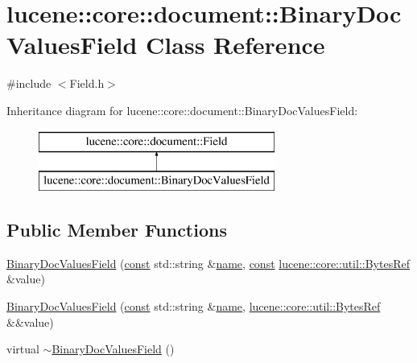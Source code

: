 \hypertarget{classlucene_1_1core_1_1document_1_1BinaryDocValuesField}{}\section{lucene\+:\+:core\+:\+:document\+:\+:Binary\+Doc\+Values\+Field Class Reference}
\label{classlucene_1_1core_1_1document_1_1BinaryDocValuesField}


{\ttfamily \#include $<$Field.\+h$>$}

Inheritance diagram for lucene\+:\+:core\+:\+:document\+:\+:Binary\+Doc\+Values\+Field\+:\begin{figure}[H]
\begin{center}
\leavevmode
\includegraphics[height=2.000000cm]{classlucene_1_1core_1_1document_1_1BinaryDocValuesField}
\end{center}
\end{figure}
\subsection*{Public Member Functions}
\begin{DoxyCompactItemize}
\item 
\mbox{\hyperlink{classlucene_1_1core_1_1document_1_1BinaryDocValuesField_ab25498388b61dec98a2a1bf9b4f73e92}{Binary\+Doc\+Values\+Field}} (\mbox{\hyperlink{ZlibCrc32_8h_a2c212835823e3c54a8ab6d95c652660e}{const}} std\+::string \&\mbox{\hyperlink{classlucene_1_1core_1_1document_1_1Field_a52f673f3b3abb14b180f5159f4726537}{name}}, \mbox{\hyperlink{ZlibCrc32_8h_a2c212835823e3c54a8ab6d95c652660e}{const}} \mbox{\hyperlink{classlucene_1_1core_1_1util_1_1BytesRef}{lucene\+::core\+::util\+::\+Bytes\+Ref}} \&value)
\item 
\mbox{\hyperlink{classlucene_1_1core_1_1document_1_1BinaryDocValuesField_aaa2e860c28eb16a67e2a2c54a6180238}{Binary\+Doc\+Values\+Field}} (\mbox{\hyperlink{ZlibCrc32_8h_a2c212835823e3c54a8ab6d95c652660e}{const}} std\+::string \&\mbox{\hyperlink{classlucene_1_1core_1_1document_1_1Field_a52f673f3b3abb14b180f5159f4726537}{name}}, \mbox{\hyperlink{classlucene_1_1core_1_1util_1_1BytesRef}{lucene\+::core\+::util\+::\+Bytes\+Ref}} \&\&value)
\item 
virtual \mbox{\hyperlink{classlucene_1_1core_1_1document_1_1BinaryDocValuesField_a1b1c95249624a9e4f78d8a213dbec948}{$\sim$\+Binary\+Doc\+Values\+Field}} ()
\end{DoxyCompactItemize}
